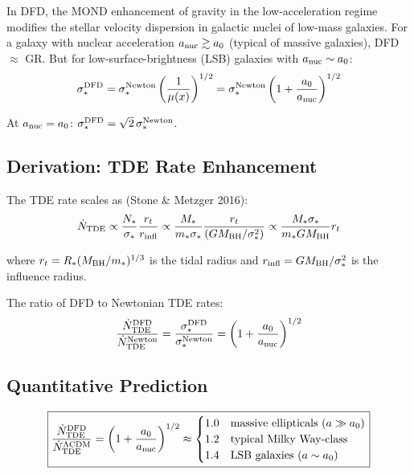 \documentclass[11pt]{article}
\begin{document}
In DFD, the MOND enhancement of gravity in the low-acceleration regime
modifies the stellar velocity dispersion in galactic nuclei of low-mass
galaxies. For a galaxy with nuclear acceleration $a_{\rm nuc} \gtrsim a_0$
(typical of massive galaxies), DFD $\approx$ GR. But for
low-surface-brightness (LSB) galaxies with $a_{\rm nuc} \sim a_0$:
\begin{equation}
\sigma_*^{\rm DFD} = \sigma_*^{\rm Newton}\left(\frac{1}{\mu(x)}\right)^{1/2}
= \sigma_*^{\rm Newton}\left(1 + \frac{a_0}{a_{\rm nuc}}\right)^{1/2}
\end{equation}

At $a_{\rm nuc} = a_0$: $\sigma_*^{\rm DFD} = \sqrt{2}\,\sigma_*^{\rm Newton}$.

\subsection{Derivation: TDE Rate Enhancement}

The TDE rate scales as (Stone \& Metzger 2016):
\begin{equation}
\dot{N}_{\rm TDE} \propto \frac{N_*}{\sigma_*}\frac{r_t}{r_{\rm infl}}
\propto \frac{M_*}{m_*\sigma_*}\frac{r_t}{\left(GM_{\rm BH}/\sigma_*^2\right)}
\propto \frac{M_*\sigma_*}{m_*GM_{\rm BH}}r_t
\end{equation}

where $r_t = R_*(M_{\rm BH}/m_*)^{1/3}$ is the tidal radius and
$r_{\rm infl} = GM_{\rm BH}/\sigma_*^2$ is the influence radius.

The ratio of DFD to Newtonian TDE rates:
\begin{equation}
\frac{\dot{N}_{\rm TDE}^{\rm DFD}}{\dot{N}_{\rm TDE}^{\rm Newton}}
= \frac{\sigma_*^{\rm DFD}}{\sigma_*^{\rm Newton}}
= \left(1 + \frac{a_0}{a_{\rm nuc}}\right)^{1/2}
\end{equation}

\subsection{Quantitative Prediction}

\begin{equation}
\boxed{
\frac{\dot{N}_{\rm TDE}^{\rm DFD}}{\dot{N}_{\rm TDE}^{\rm \Lambda CDM}}
= \left(1 + \frac{a_0}{a_{\rm nuc}}\right)^{1/2}
\approx \begin{cases}
1.0 & \text{massive ellipticals ($a \gg a_0$)} \\
1.2 & \text{typical Milky Way-class} \\
1.4 & \text{LSB galaxies ($a \sim a_0$)}
\end{cases}
}
\end{equation}
\end{document}

